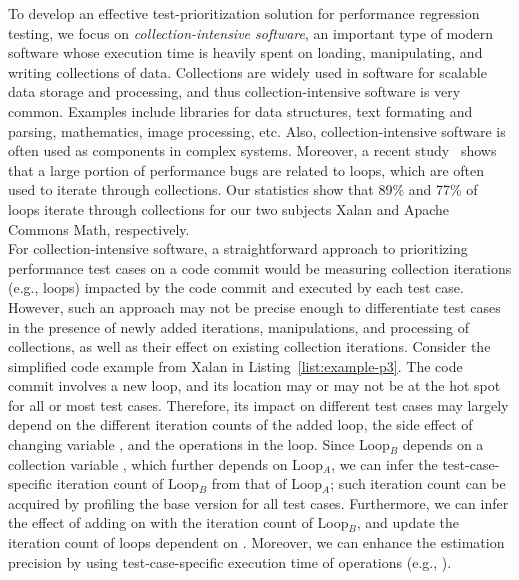 To develop an effective test-prioritization solution for performance regression testing, we focus on \textit{collection-intensive software}, an important type of modern software whose execution time is heavily spent on loading, manipulating, and writing collections of data. Collections are widely used in software for scalable data storage and processing, and thus collection-intensive software is very common. Examples include libraries for data structures, text formating and parsing, mathematics, image processing, etc. Also, collection-intensive software is often used as components in complex systems. Moreover, a recent study~\cite{JIN12} shows that a large portion of performance bugs are related to loops, which are often used to iterate through collections. Our statistics show that 89\% and 77\% of loops iterate through collections for our two subjects Xalan and Apache Commons Math, respectively.\\

%

For collection-intensive software, a straightforward approach to prioritizing performance test cases on a code commit would be measuring collection iterations (e.g., loops) impacted by the code commit and executed by each test case. However, such an approach may not be precise enough to differentiate test cases in the presence of newly added iterations, manipulations, and processing of collections, as well as their effect on existing collection iterations. Consider the simplified code example from Xalan in Listing~\ref{list:example-p3}. The code commit involves a new loop, and its location may or may not be at the hot spot for all or most test cases. Therefore, its impact on different test cases may largely depend on the different iteration counts of the added loop, the side effect of changing variable , and the operations in the loop. Since Loop$_B$ depends on a collection variable , which further depends on Loop$_A$, we can infer the test-case-specific iteration count of Loop$_B$ from that of Loop$_A$; such iteration count can be acquired by profiling the base version for all test cases. Furthermore, we can infer the effect of adding  on  with the iteration count of Loop$_B$, and update the iteration count of loops dependent on . Moreover, we can enhance the estimation precision by using test-case-specific execution time of operations (e.g., ). 


